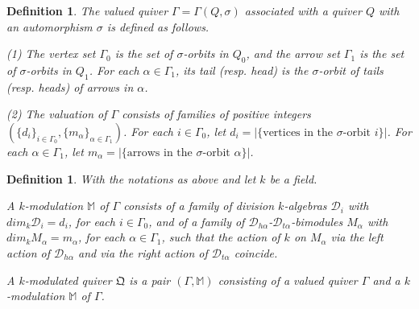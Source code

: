 \documentclass[12pt]{amsart}
\newtheorem{definition}[theorem]{Definition}
\begin{document}
\begin{definition}
    The valued quiver $\Gamma=\Gamma(Q,\sigma)$ associated with a quiver $Q$ with an automorphism $\sigma$ is defined as follows.
   
    (1) The vertex set $\Gamma_0$ is the set of $\sigma$-orbits in $Q_0$, and the arrow set $\Gamma_1$ is the set of $\sigma$-orbits in $Q_1$.
     For each $\alpha \in \Gamma_1$, its tail (resp. head) is the $\sigma$-orbit of tails (resp. heads) of arrows in $\alpha$.
    
    (2) The valuation of $\Gamma$ consists of families of positive integers $(\{ d_i\}_{i\in \Gamma_0} , \{ m_{\alpha}\}_{\alpha \in \Gamma_1})$.
    For each $i\in \Gamma_0$, let $d_i = | \{ \text{vertices in the } \sigma \text{-orbit } i  \} |$.
    For each $\alpha \in \Gamma_1$, let $m_{\alpha} = | \{ \text{arrows in the } \sigma \text{-orbit } \alpha \} |$.
 \end{definition}

\begin{definition} 
    With the notations as above and let $k$ be a field. 

    A $k$-modulation $\mathbb{M}$ of $\Gamma$ consists of a family of division $k$-algebras $\mathcal{D}_i$ with $dim_k \mathcal{D}_i = d_i$, for each $i\in \Gamma_0$, and of a family of $\mathcal{D}_{ h \alpha}$-$\mathcal{D}_{ t \alpha}$-bimodules $M_{\alpha}$ with $dim_k M_{\alpha} = m_{\alpha}$, for each $\alpha\in \Gamma_1$, such that 
    the action of $k$ on $M_{\alpha}$ via the left action of $\mathcal{D}_{h\alpha}$ and via the right action of $\mathcal{D}_{t\alpha}$ coincide.

    A $k$-modulated quiver $\mathfrak{Q}$ is a pair $(\Gamma,\mathbb{M})$ consisting of a valued quiver $\Gamma$ and a $k$-modulation $\mathbb{M}$ of $\Gamma$.
\end{definition}

\end{document}
